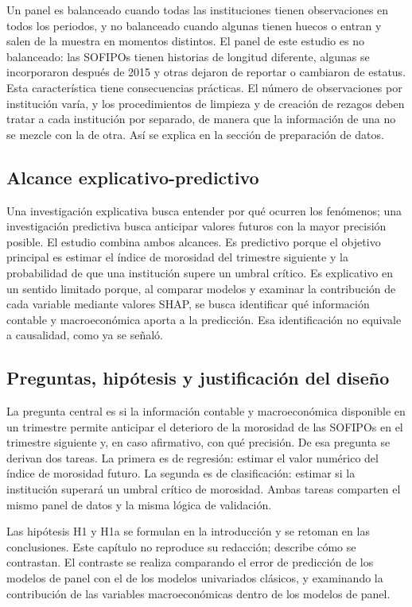 Un panel es balanceado cuando todas las instituciones tienen observaciones en todos los periodos, y no balanceado cuando algunas tienen huecos o entran y salen de la muestra en momentos distintos. El panel de este estudio es no balanceado: las SOFIPOs tienen historias de longitud diferente, algunas se incorporaron después de 2015 y otras dejaron de reportar o cambiaron de estatus. Esta característica tiene consecuencias prácticas. El número de observaciones por institución varía, y los procedimientos de limpieza y de creación de rezagos deben tratar a cada institución por separado, de manera que la información de una no se mezcle con la de otra. Así se explica en la sección de preparación de datos.

\subsection{Alcance explicativo-predictivo}
Una investigación explicativa busca entender por qué ocurren los fenómenos; una investigación predictiva busca anticipar valores futuros con la mayor precisión posible. El estudio combina ambos alcances. Es predictivo porque el objetivo principal es estimar el índice de morosidad del trimestre siguiente y la probabilidad de que una institución supere un umbral crítico. Es explicativo en un sentido limitado porque, al comparar modelos y examinar la contribución de cada variable mediante valores SHAP, se busca identificar qué información contable y macroeconómica aporta a la predicción. Esa identificación no equivale a causalidad, como ya se señaló.

\subsection{Preguntas, hipótesis y justificación del diseño}
La pregunta central es si la información contable y macroeconómica disponible en un trimestre permite anticipar el deterioro de la morosidad de las SOFIPOs en el trimestre siguiente y, en caso afirmativo, con qué precisión. De esa pregunta se derivan dos tareas. La primera es de regresión: estimar el valor numérico del índice de morosidad futuro. La segunda es de clasificación: estimar si la institución superará un umbral crítico de morosidad. Ambas tareas comparten el mismo panel de datos y la misma lógica de validación.

Las hipótesis H1 y H1a se formulan en la introducción y se retoman en las conclusiones. Este capítulo no reproduce su redacción; describe cómo se contrastan. El contraste se realiza comparando el error de predicción de los modelos de panel con el de los modelos univariados clásicos, y examinando la contribución de las variables macroeconómicas dentro de los modelos de panel. %

